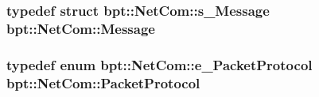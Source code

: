 \hypertarget{namespacebpt_1_1_net_com_a7d87de97bd1bd619332891928f53ec33}{
\subsubsection[{Message}]{\setlength{\rightskip}{0pt plus 5cm}typedef struct {\bf bpt\-::\-Net\-Com\-::s\-\_\-\-Message}			 {\bf bpt\-::\-Net\-Com\-::\-Message}}}\label{namespacebpt_1_1_net_com_a7d87de97bd1bd619332891928f53ec33}
\hypertarget{namespacebpt_1_1_net_com_ae55ee05019d82af5d3cc17e7e0ebedff}{
\subsubsection[{Packet\-Protocol}]{\setlength{\rightskip}{0pt plus 5cm}typedef enum {\bf bpt\-::\-Net\-Com\-::e\-\_\-\-Packet\-Protocol}					 {\bf bpt\-::\-Net\-Com\-::\-Packet\-Protocol}}}\label{namespacebpt_1_1_net_com_ae55ee05019d82af5d3cc17e7e0ebedff}


